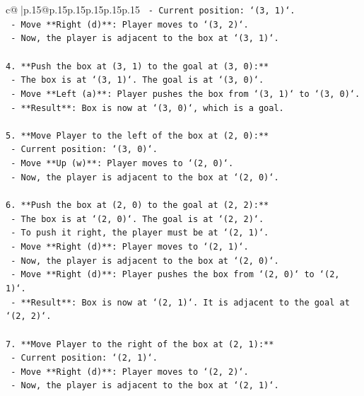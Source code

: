 \documentclass{article}
\begin{document}
{\begin{supertabular}{c@{$\;$}|p{.15\linewidth}@{}p{.15\linewidth}p{.15\linewidth}p{.15\linewidth}p{.15\linewidth}p{.15\linewidth}}
{{{\texttt{    {-} Current position: `(3, 1)`.} \\
\texttt{    {-} Move **Right (d)**: Player moves to `(3, 2)`.} \\
\texttt{    {-} Now, the player is adjacent to the box at `(3, 1)`.} \\
\\ 
\texttt{4.  **Push the box at (3, 1) to the goal at (3, 0):**} \\
\texttt{    {-} The box is at `(3, 1)`. The goal is at `(3, 0)`.} \\
\texttt{    {-} Move **Left (a)**: Player pushes the box from `(3, 1)` to `(3, 0)`.} \\
\texttt{    {-} **Result**: Box is now at `(3, 0)`, which is a goal.} \\
\\ 
\texttt{5.  **Move Player to the left of the box at (2, 0):**} \\
\texttt{    {-} Current position: `(3, 0)`.} \\
\texttt{    {-} Move **Up (w)**: Player moves to `(2, 0)`.} \\
\texttt{    {-} Now, the player is adjacent to the box at `(2, 0)`.} \\
\\ 
\texttt{6.  **Push the box at (2, 0) to the goal at (2, 2):**} \\
\texttt{    {-} The box is at `(2, 0)`. The goal is at `(2, 2)`.} \\
\texttt{    {-} To push it right, the player must be at `(2, 1)`.} \\
\texttt{    {-} Move **Right (d)**: Player moves to `(2, 1)`.} \\
\texttt{    {-} Now, the player is adjacent to the box at `(2, 0)`.} \\
\texttt{    {-} Move **Right (d)**: Player pushes the box from `(2, 0)` to `(2, 1)`.} \\
\texttt{    {-} **Result**: Box is now at `(2, 1)`. It is adjacent to the goal at `(2, 2)`.} \\
\\ 
\texttt{7.  **Move Player to the right of the box at (2, 1):**} \\
\texttt{    {-} Current position: `(2, 1)`.} \\
\texttt{    {-} Move **Right (d)**: Player moves to `(2, 2)`.} \\
\texttt{    {-} Now, the player is adjacent to the box at `(2, 1)`.} \\
\\ 
}}}
\end{supertabular}}
\end{document}

